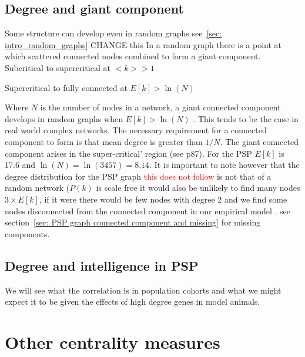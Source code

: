 \subsection{Degree and giant component}
\label{sec:connected component and degree}
Some structure can develop even in random graphs see~\ref{sec: intro_random_graphs}
 CHANGE this
In a random graph there is a point at which scattered connected nodes combined to form a giant component. Subcritical to supercritical at $<k> >1$


Supercritical to fully connected at $E[k] > \ln(N)$


Where $N$ is the number of nodes in a network, a giant connected component develops in random graphs when $E[k] > \ln (N)$ \cite{barabasi2016network}. This tends to be the case in real world complex networks. The necessary requirement for a connected component to form is that mean degree is greater than $1/N$. The giant connected component arises in the super-critical' region (see \cite{barabasi2016network} p87). For the PSP $E[k]$ is 17.6 and $\ln(N)=\ln(3457)=8.14$.  It is important to note however that the degree distribution for the PSP graph \textcolor{red}{this does not follow} is not that of a random network ($P(k)$ is scale free it would also be unlikely to find many nodes $ 3 \times E[k]$, if it were there would be few nodes with degree 2 and we find some nodes disconnected from the connected component in our empirical model .   see section~\ref{sec: PSP graph connected component and missing} for missing components.


\subsection{Degree and intelligence in PSP}
We will see what the correlation is in population cohorts and what we might expect it to be given the effects of high degree genes in model animals. 


\section{Other centrality measures}

